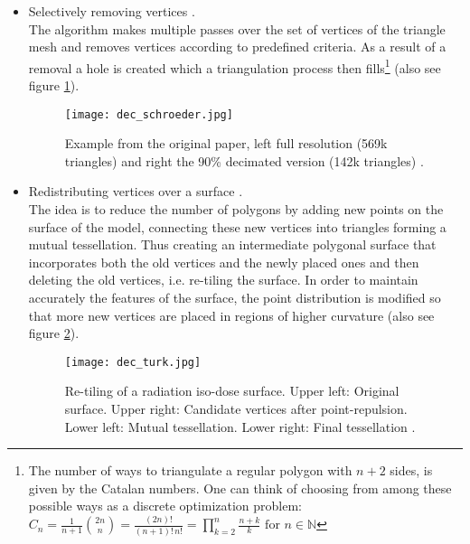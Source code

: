 \begin{itemize}
    \item Selectively removing vertices \citep[cf.][]{Schroeder1992}.\\
The algorithm makes multiple passes over the set of vertices of the triangle mesh and removes vertices according to predefined criteria. As a result of a removal a hole is created which a triangulation process then fills\footnote{ The number of ways to triangulate a regular polygon with $n+2$ sides, is given by the Catalan numbers. One can think of choosing from among these possible ways as a discrete optimization problem:\\
$C_{n} = \frac{1}{n+1}{2n \choose n} = \frac{(2n)!}{(n+1)!\,n!} = \prod \limits_{k=2}^{n}\frac{n+k}{k} \text{ for } n \in \mathbb{N}$} (also see figure \ref{fig:dec_schroeder}).
\begin{figure}[hbt]
\centering
\texttt{[image: dec\_schroeder.jpg]}
\caption{Example from the original paper, left full resolution (569k triangles) and right the 90\% decimated version (142k triangles) \citep[][p.68]{Schroeder1992}.}
\label{fig:dec_schroeder}
\end{figure} 

    \item Redistributing vertices over a surface \citep[cf.][]{Turk1992}.\\
The idea is to reduce the number of polygons by adding new points on the surface of the model, connecting these new vertices into triangles forming a mutual tessellation. Thus creating an intermediate polygonal surface that incorporates both the old vertices and the newly placed ones and then deleting the old vertices, i.e. re-tiling the surface. In order to maintain accurately the features of the surface, the point distribution is modified so that more new vertices are placed in regions of higher curvature (also see figure \ref{fig:dec_turk}).
\begin{figure}[ht]
\centering
\texttt{[image: dec\_turk.jpg]}
\caption{Re-tiling of a radiation iso-dose surface. Upper left: Original surface. Upper right: Candidate vertices after point-repulsion. Lower left: Mutual tessellation. Lower right: Final tessellation \citep[][p.58]{Turk1992}.}
\label{fig:dec_turk}
\end{figure} 


\end{itemize}
